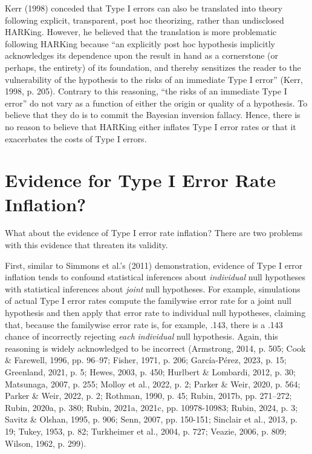 \documentclass[authordate, meta]{jote-new-article}
\begin{document}
	Kerr (1998) conceded that Type I errors can also be translated into theory following explicit, transparent, post hoc theorizing, rather than undisclosed HARKing. However, he believed that the translation is more problematic following HARKing because “an explicitly post hoc hypothesis implicitly acknowledges its dependence upon the result in hand as a cornerstone (or perhaps, the entirety) of its foundation, and thereby sensitizes the reader to the vulnerability of the hypothesis to the risks of an immediate Type I error” (Kerr, 1998, p. 205). Contrary to this reasoning, “the risks of an immediate Type I error” do not vary as a function of either the origin or quality of a hypothesis. To believe that they do is to commit the Bayesian inversion fallacy. Hence, there is no reason to believe that HARKing either inflates Type I error rates or that it exacerbates the costs of Type I errors.



	\section{Evidence for Type I Error Rate Inflation?}



	What about the evidence of Type I error rate inflation? There are two problems with this evidence that threaten its validity.



	First, similar to Simmons et al.'s (2011) demonstration, evidence of Type I error inflation tends to confound statistical inferences about \emph{individual} null hypotheses with statistical inferences about \emph{joint} null hypotheses. For example, simulations of actual Type I error rates compute the familywise error rate for a joint null hypothesis and then apply that error rate to individual null hypotheses, claiming that, because the familywise error rate is, for example, .143, there is a .143 chance of incorrectly rejecting \emph{each} \emph{individual }null hypothesis. Again, this reasoning is widely acknowledged to be incorrect (Armstrong, 2014, p. 505; Cook \& Farewell, 1996, pp. 96--97; Fisher, 1971, p. 206; García-Pérez, 2023, p. 15; Greenland, 2021, p. 5; Hewes, 2003, p. 450; Hurlbert \& Lombardi, 2012, p. 30; Matsunaga, 2007, p. 255; Molloy et al., 2022, p. 2; Parker \& Weir, 2020, p. 564; Parker \& Weir, 2022, p. 2; Rothman, 1990, p. 45; Rubin, 2017b, pp. 271--272; Rubin, 2020a, p. 380; Rubin, 2021a, 2021c, pp. 10978-10983; Rubin, 2024, p. 3; Savitz \& Olshan, 1995, p. 906; Senn, 2007, pp. 150-151; Sinclair et al., 2013, p. 19; Tukey, 1953, p. 82; Turkheimer et al., 2004, p. 727; Veazie, 2006, p. 809; Wilson, 1962, p. 299).
\end{document}
